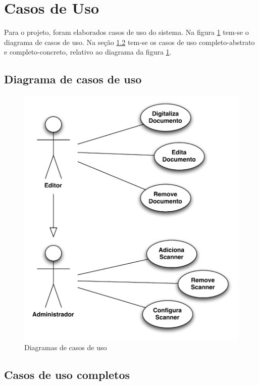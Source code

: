 

\section{Casos de Uso}
\label{sec:casos_de_uso}

Para o projeto, foram elaborados casos de uso do sistema. Na figura \ref{fig:casos_de_uso}
tem-se o diagrama de casos de uso. Na seção \ref{sec:casos_completos} tem-se os casos de uso
completo-abstrato e completo-concreto, relativo ao diagrama da figura \ref{fig:casos_de_uso}.

\subsection{Diagrama de casos de uso}
\begin{figure}[ht]
 \centering
  \includegraphics[scale=0.7]{img/use-case-diagram.pdf}
  \caption {Diagramas de casos de uso}
  \label{fig:casos_de_uso}
\end{figure}

\subsection{Casos de uso completos}
\label{sec:casos_completos}

